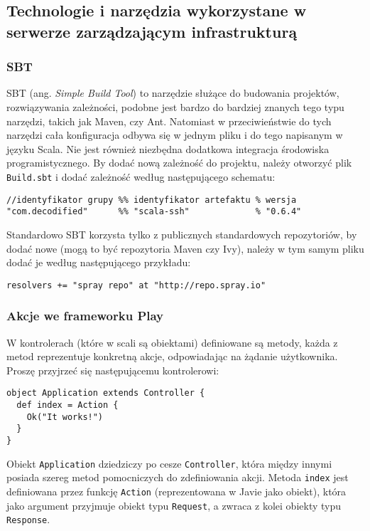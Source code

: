 \subsection{Technologie i narzędzia wykorzystane w serwerze zarządzającym infrastrukturą}

\subsubsection{SBT}

SBT (ang. \emph{Simple Build Tool}) to narzędzie służące do budowania projektów, rozwiązywania zależności, podobne jest bardzo do bardziej znanych tego typu narzędzi, takich jak Maven, czy Ant. Natomiast w przeciwieństwie do tych narzędzi cała konfiguracja odbywa się w jednym pliku i do tego napisanym w języku Scala. Nie jest również niezbędna dodatkowa integracja środowiska programistycznego. By dodać nową zależność do projektu, należy otworzyć plik \lstinline|Build.sbt| i dodać zależność według następującego schematu:

\begin{lstlisting}
//identyfikator grupy %% identyfikator artefaktu % wersja
"com.decodified"      %% "scala-ssh"             % "0.6.4"
\end{lstlisting}

Standardowo SBT korzysta tylko z publicznych standardowych repozytoriów, by dodać nowe (mogą to być repozytoria Maven czy Ivy), należy w tym samym pliku dodać je według następującego przykładu:

\begin{lstlisting}
resolvers += "spray repo" at "http://repo.spray.io"
\end{lstlisting}

\subsubsection{Akcje we frameworku Play}

W kontrolerach (które w scali są obiektami) definiowane są metody, każda z metod reprezentuje konkretną akcje, odpowiadając na żądanie użytkownika. Proszę przyjrzeć się następującemu kontrolerowi:

\begin{lstlisting}
object Application extends Controller {
  def index = Action {
    Ok("It works!")
  }
}
\end{lstlisting}

Obiekt \lstinline{Application} dziedziczy po cesze \lstinline{Controller}, która między innymi posiada szereg metod pomocniczych do zdefiniowania akcji. Metoda \lstinline{index} jest definiowana przez funkcję \lstinline{Action} (reprezentowana w Javie jako obiekt), która jako argument przyjmuje obiekt typu \lstinline{Request}, a zwraca z kolei obiekty typu \lstinline{Response}. 

